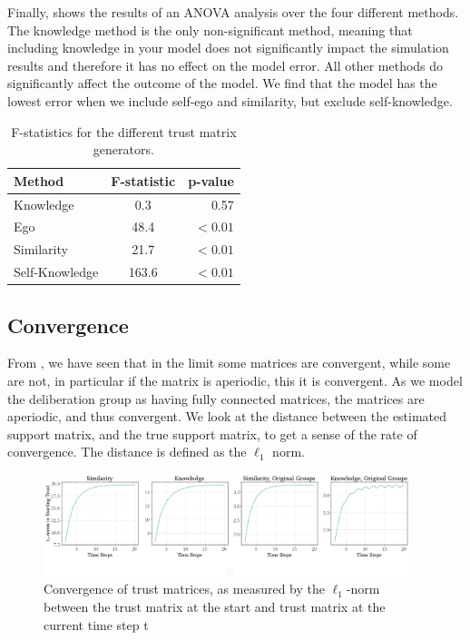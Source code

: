 Finally,  shows the results of an ANOVA analysis over the
four different methods. The knowledge method is the only non-significant
method, meaning that including knowledge in your model does not significantly
impact the simulation results and therefore it has no effect on the model
error. All other methods do significantly affect the outcome of the model. We
find that the model has the lowest error when we include self-ego and
similarity, but exclude self-knowledge.


\begin{table}
	\caption{F-statistics for the different trust matrix generators.}\label{tab:anova_trust}
	\begin{center}
		\begin{tabular}[c]{lcr}
			\toprule
			Method & F-statistic& p-value \\
			\hline
			Knowledge & 0.3 & 0.57 \\
			Ego & 48.4& $<0.01$ \\
			Similarity & 21.7& $< 0.01$ \\
			Self-Knowledge & 163.6& $ <0.01$ \\
			
			\bottomrule
		\end{tabular}
	\end{center}
\end{table}

\subsection{Convergence}

From , we have seen that in the limit some matrices are
convergent, while some are not, in particular if the matrix is aperiodic, this
it is convergent. As we model the deliberation group as having fully connected
matrices, the matrices are aperiodic, and thus convergent. We look at the
distance between the estimated support matrix, and the true support matrix, to
get a sense of the rate of convergence. The distance is defined as the 
$\ell_1$ norm.

\begin{figure}[h]
	\begin{center}
		\includegraphics[width=0.95\textwidth]{Figures/convergence_groups.png}
	\end{center}
	\caption{Convergence of trust matrices, as measured by the $\ell_1$-norm between the trust matrix at the start and  trust matrix at the current time step
		t}\label{fig:convergence_big}
\end{figure}




